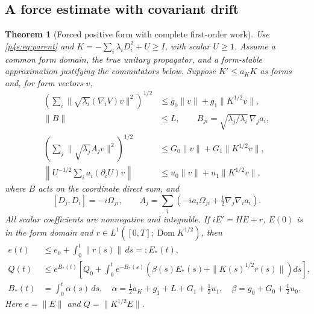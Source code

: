\documentclass[11pt]{article}
\numberwithin{equation}{section}
\newtheorem{theorem}{Theorem}[section]
\theoremstyle{definition}
\theoremstyle{remark}
\begin{document}
\subsection{A force estimate with covariant drift}

\begin{theorem}[Forced positive form with complete first-order work]
\label{p4s:thm:force}
Use \eqref{p4s:eq:parent} and
$K=-\sum_i\lambda_iD_i^2+U\geq I$, with scalar $U\geq1$.
Assume a common form domain, the true unitary propagator, and a
form-stable approximation justifying the commutators below. Suppose
$K'\leq a_KK$ as forms and, for form vectors $v$,
\begin{align*}
 \left(\sum_i\|\sqrt{\lambda_i}(\nabla_iV)v\|^2\right)^{1/2}
       &\leq g_0\|v\|+g_1\|K^{1/2}v\|,\\
 \|B\|&\leq L,\qquad
 B_{ji}=\sqrt{\lambda_j/\lambda_i}\,\nabla_j a_i,\\
 \left(\sum_j\|\sqrt{\lambda_j}A_jv\|^2\right)^{1/2}
       &\leq G_0\|v\|+G_1\|K^{1/2}v\|,\\
 \left\|U^{-1/2}\sum_i a_i(\partial_iU)v\right\|
       &\leq u_0\|v\|+u_1\|K^{1/2}v\|,
\end{align*}
where $B$ acts on the coordinate direct sum, and
\[
 [D_j,D_i]=-i\Omega_{ji},\qquad
 A_j=\sum_i\left(-ia_i\Omega_{ji}
                          +\tfrac12\nabla_j\nabla_i a_i\right).
\]
All scalar coefficients are nonnegative and integrable.
If $iE'=HE+r$, $E(0)$ is in the form domain and
$r\in L^1([0,T];\operatorname{Dom}K^{1/2})$, then
\begin{align}
 e(t)&\leq e_0+\int_0^t\|r(s)\|\,ds=:E_*(t),\nonumber\\
 Q(t)&\leq e^{B_*(t)}
  \left[Q_0+\int_0^t e^{-B_*(s)}
       \left(\beta(s)E_*(s)+\|K(s)^{1/2}r(s)\|\right)ds\right],
       \label{p4s:eq:force}\\
 B_*(t)&=\int_0^t\alpha(s)\,ds,\quad
 \alpha=\tfrac12a_K+g_1+L+G_1+\tfrac12u_1,\quad
 \beta=g_0+G_0+\tfrac12u_0 .\nonumber
\end{align}
Here $e=\|E\|$ and $Q=\|K^{1/2}E\|$.
\end{theorem}
\end{document}
